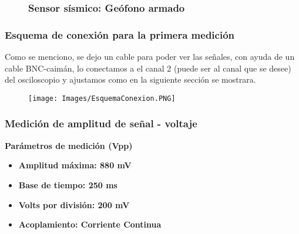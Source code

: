 \documentclass[12pt]{article}
\begin{document}
  \begin{figure}[htbp]
  \subsubsection{Sensor sísmico: Geófono armado}
\centering
{}

\end{figure}
            
	        \newpage
	       
	        
	        \subsubsection{Esquema de conexión para la primera medición}
	        Como se menciono, se dejo un cable para poder ver las señales, con ayuda de un cable BNC-caimán, lo conectamos a el canal 2 (puede ser al canal que se desee) del osciloscopio y ajustamos como en la siguiente sección se mostrara.
	        
    	        \begin{figure}[H]
        	       \centering
        	       \texttt{[image: Images/EsquemaConexion.PNG]}
        	    \end{figure}
	        
	        \subsubsection{Medición de amplitud de señal - voltaje}
	        
            \textbf{Parámetros de medición (Vpp)}
            \begin{multicols}{2}
                \begin{itemize}
                    \item[\checkmark] \textbf{Amplitud máxima: 880 mV}
                    \item[\checkmark] \textbf{Base de tiempo: 250 ms}
            \columnbreak
                    \item[\checkmark] \textbf{Volts por división: 200 mV}
                    \item[\checkmark] \textbf{Acoplamiento: Corriente Continua}
                \end{itemize}
            \end{multicols}
            
\end{document}
